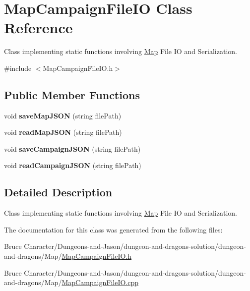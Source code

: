 \hypertarget{class_map_campaign_file_i_o}{}\section{Map\+Campaign\+File\+IO Class Reference}
\label{class_map_campaign_file_i_o}


Class implementing static functions involving \hyperlink{class_map}{Map} File IO and Serialization.  




{\ttfamily \#include $<$Map\+Campaign\+File\+I\+O.\+h$>$}

\subsection*{Public Member Functions}
\begin{DoxyCompactItemize}
\item 
\hypertarget{class_map_campaign_file_i_o_a60c4e254979763fbee357ab2f1f1dd32}{}\label{class_map_campaign_file_i_o_a60c4e254979763fbee357ab2f1f1dd32} 
void {\bfseries save\+Map\+J\+S\+ON} (string file\+Path)
\item 
\hypertarget{class_map_campaign_file_i_o_a751d721e01346c5f32cf556349e1cb8f}{}\label{class_map_campaign_file_i_o_a751d721e01346c5f32cf556349e1cb8f} 
void {\bfseries read\+Map\+J\+S\+ON} (string file\+Path)
\item 
\hypertarget{class_map_campaign_file_i_o_afb7275ed76dd0ce2d73f12bf12206460}{}\label{class_map_campaign_file_i_o_afb7275ed76dd0ce2d73f12bf12206460} 
void {\bfseries save\+Campaign\+J\+S\+ON} (string file\+Path)
\item 
\hypertarget{class_map_campaign_file_i_o_a0676c2315398387f5a626cd91a980d7e}{}\label{class_map_campaign_file_i_o_a0676c2315398387f5a626cd91a980d7e} 
void {\bfseries read\+Campaign\+J\+S\+ON} (string file\+Path)
\end{DoxyCompactItemize}


\subsection{Detailed Description}
Class implementing static functions involving \hyperlink{class_map}{Map} File IO and Serialization. 

The documentation for this class was generated from the following files\+:\begin{DoxyCompactItemize}
\item 
Bruce Character/\+Dungeons-\/and-\/\+Jason/dungeon-\/and-\/dragons-\/solution/dungeon-\/and-\/dragons/\+Map/\hyperlink{_map_campaign_file_i_o_8h}{Map\+Campaign\+File\+I\+O.\+h}\item 
Bruce Character/\+Dungeons-\/and-\/\+Jason/dungeon-\/and-\/dragons-\/solution/dungeon-\/and-\/dragons/\+Map/\hyperlink{_map_campaign_file_i_o_8cpp}{Map\+Campaign\+File\+I\+O.\+cpp}\end{DoxyCompactItemize}

